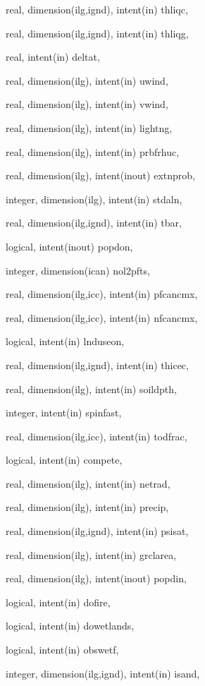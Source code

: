 {\begin{DoxyParamCaption}
\item[{real, dimension(ilg,ignd), intent(in)}]{thliqc, }
\item[{real, dimension(ilg,ignd), intent(in)}]{thliqg, }
\item[{real, intent(in)}]{deltat, }
\item[{real, dimension(ilg), intent(in)}]{uwind, }
\item[{real, dimension(ilg), intent(in)}]{vwind, }
\item[{real, dimension(ilg), intent(in)}]{lightng, }
\item[{real, dimension(ilg), intent(in)}]{prbfrhuc, }
\item[{real, dimension(ilg), intent(inout)}]{extnprob, }
\item[{integer, dimension(ilg), intent(in)}]{stdaln, }
\item[{real, dimension(ilg,ignd), intent(in)}]{tbar, }
\item[{logical, intent(inout)}]{popdon, }
\item[{integer, dimension(ican)}]{nol2pfts, }
\item[{real, dimension(ilg,icc), intent(in)}]{pfcancmx, }
\item[{real, dimension(ilg,icc), intent(in)}]{nfcancmx, }
\item[{logical, intent(in)}]{lnduseon, }
\item[{real, dimension(ilg,ignd), intent(in)}]{thicec, }
\item[{real, dimension(ilg), intent(in)}]{soildpth, }
\item[{integer, intent(in)}]{spinfast, }
\item[{real, dimension(ilg,icc), intent(in)}]{todfrac, }
\item[{logical, intent(in)}]{compete, }
\item[{real, dimension(ilg), intent(in)}]{netrad, }
\item[{real, dimension(ilg), intent(in)}]{precip, }
\item[{real, dimension(ilg,ignd), intent(in)}]{psisat, }
\item[{real, dimension(ilg), intent(in)}]{grclarea, }
\item[{real, dimension(ilg), intent(inout)}]{popdin, }
\item[{logical, intent(in)}]{dofire, }
\item[{logical, intent(in)}]{dowetlands, }
\item[{logical, intent(in)}]{obswetf, }
\item[{integer, dimension(ilg,ignd), intent(in)}]{isand, }

\end{DoxyParamCaption}}
